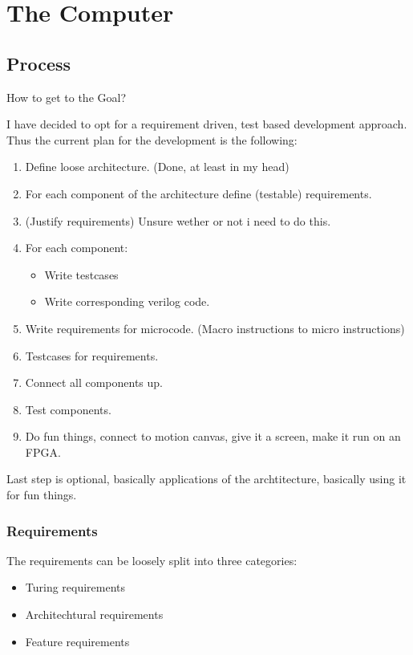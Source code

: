\chapter{The Computer} %
\label{chap:The Computer}



\section{Process}
How to get to the Goal?

I have decided to opt for a requirement driven, test based development approach. Thus the current plan for the development is the following:
\begin{enumerate}
  \item Define loose architecture. (Done, at least in my head)
  \item For each component of the architecture define (testable) requirements. 
  \item (Justify requirements) Unsure wether or not i need to do this.
  \item For each component:
  \begin{itemize}
    \item Write testcases
    \item Write corresponding verilog code.
  \end{itemize}
  \item Write requirements for microcode. (Macro instructions to micro instructions) 
  \item Testcases for requirements. 
  \item Connect all components up.
  \item Test components.
  \item Do fun things, connect to motion canvas, give it a screen, make it run on an FPGA.
\end{enumerate}

Last step is optional, basically applications of the archtitecture, basically using it for fun things. 


\subsection{Requirements}
The requirements can be loosely split into three categories:

\begin{itemize}
  \item Turing requirements
  \item Architechtural requirements
  \item Feature requirements
\end{itemize}


